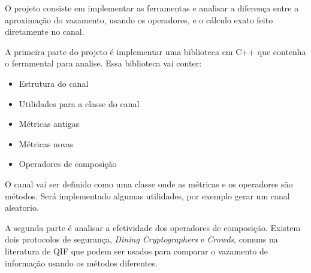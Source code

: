 %
%
%
%

O projeto consiste em implementar as ferramentas e analisar a diferença entre a aproximação do vazamento, usando os operadores, e o cálculo exato feito diretamente no canal.

A primeira parte do projeto é implementar uma biblioteca em C++ que contenha o ferramental para analise. Essa biblioteca vai conter:

\begin{itemize}
  \item{Estrutura do canal}
  \item{Utilidades para a classe do canal}
  \item{Métricas antigas}
  \item{Métricas novas}
  \item{Operadores de composição}
\end{itemize}

O canal vai ser definido como uma classe onde as métricas e os operadores são métodos. 
Será implementado algumas utilidades, por exemplo gerar um canal aleatorio.

A segunda parte é analisar a efetividade dos operadores de composição.
Existem dois protocolos de segurança, \emph{Dining Cryptographers} e \emph{Crowds}, comuns na literatura de QIF que podem ser usados para comparar o vazamento de informação usando os métodos diferentes.
